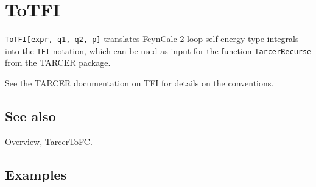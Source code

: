 \documentclass[../FeynCalcManual.tex]{subfiles}
\begin{document}
\hypertarget{totfi}{
\section{ToTFI}\label{totfi}}

\texttt{ToTFI[\allowbreak{}expr,\ \allowbreak{}q1,\ \allowbreak{}q2,\ \allowbreak{}p]}
translates FeynCalc 2-loop self energy type integrals into the
\texttt{TFI} notation, which can be used as input for the function
\texttt{TarcerRecurse} from the TARCER package.

See the TARCER documentation on TFI for details on the conventions.

\subsection{See also}

\hyperlink{toc}{Overview}, \hyperlink{tarcertofc}{TarcerToFC}.

\subsection{Examples}
\end{document}
